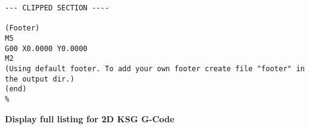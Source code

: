 \begin{lstlisting}[caption={App4-Display excerpt listing for 2D KSG G-Code}, label=App4-Display excerpt listing for 2D KSG G-Code]
--- CLIPPED SECTION ----

(Footer)
M5
G00 X0.0000 Y0.0000
M2
(Using default footer. To add your own footer create file "footer" in the output dir.)
(end)
%
\end{lstlisting}

\pagebreak
\textbf{Display full listing for 2D KSG G-Code}
\vspace{0.3cm}


